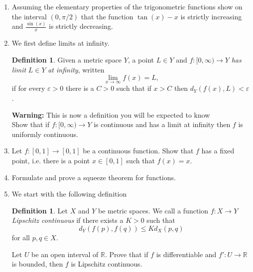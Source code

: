 \documentclass[12pt,letterpaper]{article}
\theoremstyle{plain}
\theoremstyle{definition}
\newtheorem{definition}[theorem]{Definition}
\begin{document}
\begin{enumerate}[1.]
\item Assuming the elementary properties of the trigonometric functions show on the interval $(0,\pi/2)$ that the function $\tan(x)-x$ is strictly increasing and $\frac{\sin(x)}{x}$ is strictly decreasing. 
\item We first define limits at infinity.  
\begin{definition}
Given a metric space $Y$, a point $L\in Y$ and $f:[0,\infty)\rightarrow Y$ \emph{has limit }$L\in Y$ \emph{at infinity}, written 
\[\lim_{x\rightarrow \infty}f(x)=L,\]
if for every $\varepsilon>0$ there is a $C>0$ such that if $x>C$ then $d_Y(f(x),L)<\varepsilon$. 
\end{definition}
{\bf Warning:} This is now a definition you will be expected to know\\

Show that if $f:[0,\infty)\rightarrow Y$ is continuous and has a limit at infinity then $f$ is uniformly continuous.  

\item Let $f:[0,1]\rightarrow [0,1]$ be a continuous function. Show that $f$ has a fixed point, i.e. there is a point $x\in [0,1]$ such that $f(x)=x$. 
\item Formulate and prove a squeeze theorem for functions. 
\item We start with the following definition
\begin{definition}Let $X$ and $Y$ be metric spaces.  We call a function $f:X\rightarrow Y $ \emph{Lipschitz continuous} if there exists a $K>0$ such that 
\[d_{Y}(f(p),f(q))\leq K d_X(p,q)\]
 for all $p,q\in X$. 
\end{definition}
 Let $U$ be an open interval of $\mathbb{R}$. Prove that if $f$ is differentiable and $f\prime :U\rightarrow \mathbb{R}$ is bounded, then $f$ is Lipschitz continuous. 
\end{enumerate}
\end{document}
